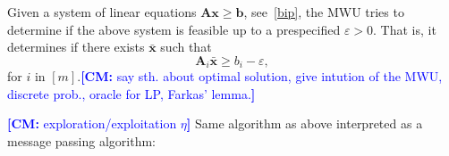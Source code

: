 \documentclass[11pt, DIV=12]{scrartcl}
\theoremstyle{definition}
\newcommand{\cO}{\ensuremath{{\mathcal O}}\xspace}
\newcommand{\trans}{^\mathsf{T}}
\renewcommand{\vec}[1]{\mathbf{#1}}
\newcommand{\cm}[1]{{{\textcolor{blue}{\textbf{[CM:} {#1}\textbf{]}}}}}
\begin{document}
Given a system of linear equations $\vec{A} \vec{x} \geq \vec{b}$, see~\cref{bip}, the MWU tries to determine if the above system is feasible up to a prespecified $\varepsilon > 0$. That is, it determines if there exists $\vec{\bar{x}}$ such that 
\begin{equation}\label{epsfeas}
\vec{A}_i \vec{\bar{x}} \geq b_i - \varepsilon,
\end{equation}
for $i$ in $[m]$.\cm{say sth. about optimal solution, give intution of the MWU, discrete prob., oracle for LP, Farkas' lemma.}

%		
\cm{exploration/exploitation $\eta$}
Same algorithm as above interpreted as a message passing algorithm:
\end{document}
